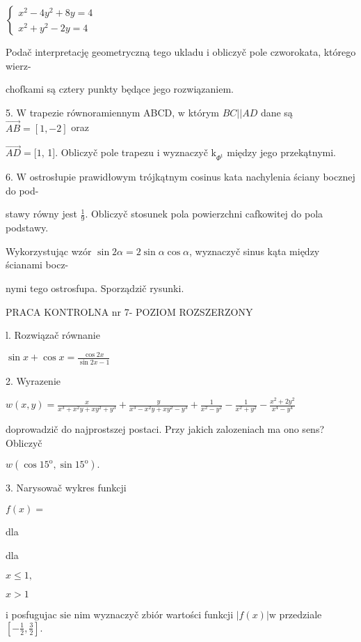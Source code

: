 \documentclass[a4paper,12pt]{article}
\begin{document}
$\left\{\begin{array}{l}
x^{2}-4y^{2}+8y=4\\
x^{2}+y^{2}-2y=4
\end{array}\right.$

Podač interpretację geometryczną tego ukladu $\mathrm{i}$ obliczyč pole czworokata, którego wierz-

chofkami są cztery punkty będące jego rozwiązaniem.

5. $\mathrm{W}$ trapezie równoramiennym ABCD, $\mathrm{w}$ którym $BC||AD$ dane są $\vec{AB} = [1,-2]$ oraz

$\vec{AD}=[1$, 1$]$. Obliczyč pole trapezu $\mathrm{i}$ wyznaczyč $\mathrm{k}_{\Phi^{\mathrm{t}}}$ między jego przekątnymi.

6. $\mathrm{W}$ ostrosłupie prawidłowym trójkątnym cosinus kata nachylenia ściany bocznej do pod-

stawy równy jest $\displaystyle \frac{1}{9}$. Obliczyč stosunek pola powierzchni cafkowitej do pola podstawy.

Wykorzystując wzór $\sin 2\alpha=2\sin\alpha\cos\alpha$, wyznaczyč sinus kąta między ścianami bocz-

nymi tego ostrosfupa. Sporządzič rysunki.





PRACA KONTROLNA nr 7- POZIOM ROZSZERZONY

l. Rozwiązač równanie

$\displaystyle \sin x+\cos x=\frac{\cos 2x}{\sin 2x-1}$

2. Wyrazenie

$w(x,y)=\displaystyle \frac{x}{x^{3}+x^{2}y+xy^{2}+y^{3}}+\frac{y}{x^{3}-x^{2}y+xy^{2}-y^{3}}+\frac{1}{x^{2}-y^{2}}-\frac{1}{x^{2}+y^{2}}-\frac{x^{2}+2y^{2}}{x^{4}-y^{4}}$

doprowadzič do najprostszej postaci. Przy jakich zalozeniach ma ono sens? Obliczyč

$w(\cos 15^{\mathrm{o}},\sin 15^{\mathrm{o}}).$

3. Narysowač wykres funkcji

$f(x)=$

dla

dla

$x\leq 1,$

$x>1$

$\mathrm{i}$ posfugujac $\mathrm{s}\mathrm{i}\mathrm{e}$ nim wyznaczyč zbiór wartości funkcji $|f(x)|\mathrm{w}$ przedziale $[-\displaystyle \frac{1}{2},\frac{3}{2}].$
\end{document}

